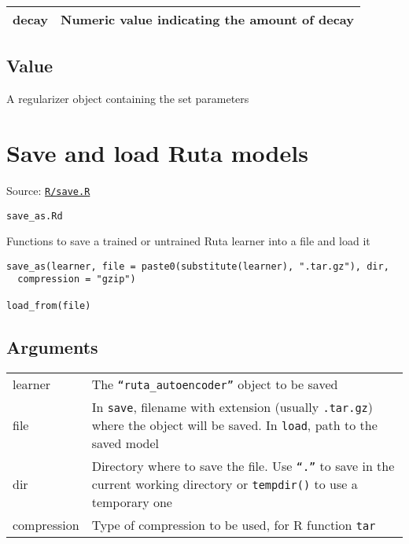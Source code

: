 \begin{longtable}[c]{@{}>{\small}p{3cm}>{\raggedright}p{12.5cm}@{}}
\toprule
decay & Numeric value indicating the amount of decay\tabularnewline
\bottomrule
\end{longtable}

\hypertarget{value}{\subsection{\texorpdfstring{\protect\hyperlink{value}{}Value}{Value}}\label{value}}

A regularizer object containing the set parameters

\section{Save and load Ruta models}\label{save-and-load-ruta-models}

Source:
\href{https://github.com/fdavidcl/ruta/blob/master/R/save.R}{\texttt{R/save.R}}

\texttt{save\_as.Rd}

Functions to save a trained or untrained Ruta learner into a file and
load it

\begin{verbatim}
save_as(learner, file = paste0(substitute(learner), ".tar.gz"), dir,
  compression = "gzip")

load_from(file)
\end{verbatim}

\hypertarget{arguments}{\subsection{\texorpdfstring{\protect\hyperlink{arguments}{}Arguments}{Arguments}}\label{arguments}}

\begin{longtable}[c]{@{}>{\small}p{3cm}>{\raggedright}p{12.5cm}@{}}
\toprule
learner & The \texttt{``ruta\_autoencoder''} object to be
saved\tabularnewline
file & In \texttt{save}, filename with extension (usually
\texttt{.tar.gz}) where the object will be saved. In \texttt{load}, path
to the saved model\tabularnewline
dir & Directory where to save the file. Use \texttt{``.''} to save in the
current working directory or \texttt{tempdir()} to use a temporary
one\tabularnewline
compression & Type of compression to be used, for R function
\texttt{tar}\tabularnewline
\bottomrule
\end{longtable}

